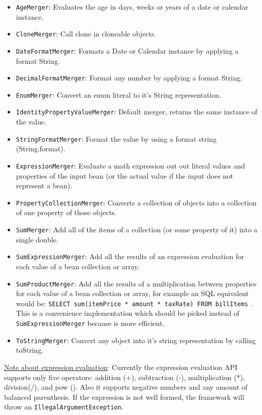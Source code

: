 \documentclass[11pt]{article}
\begin{document}
\begin{itemize}
 \item \texttt{AgeMerger}: Evaluates the age in days, weeks or years of a date or calendar instance.
 \item \texttt{CloneMerger}: Call clone in cloneable objects.
 \item \texttt{DateFormatMerger}: Formats a Date or Calendar instance by applying a format String.
 \item \texttt{DecimalFormatMerger}: Format any number by applying a format String.
 \item \texttt{EnumMerger}: Convert an enum literal to it's String representation.
 \item \texttt{IdentityPropertyValueMerger}: Default merger, returns the same instance of the value.
 \item \texttt{StringFormatMerger}: Format the value by using a format string (String.format).
 \item \texttt{ExpressionMerger}: Evaluate a math expression out out literal values and properties of the input bean (or the actual value if the input does not represent a bean).
 \item \texttt{PropertyCollectionMerger}: Converts a collection of objects into a collection of one property of those objects.
 \item \texttt{SumMerger}: Add all of the items of a collection (or some property of it) into a single double.
 \item \texttt{SumExpressionMerger}: Add all the results of an expression evaluation for each value of a bean collection or array.
 \item \texttt{SumProductMerger}: Add all the results of a multiplication between properties for each value of a bean collection or array, for example an SQL equivalent would be: \texttt{SELECT sum(itemPrice * amount * taxRate) FROM billItems }. This is a convenience implementation which should be picked instead of \texttt{SumExpressionMerger} because is more efficient.
 \item \texttt{ToStringMerger}: Convert any object into it's string representation by calling toString.
\end{itemize}

\underline{Note about expression evaluation}: Currently the expression evaluation API supports only five operators: addition (+), subtraction (-), multiplication (*), division(/), and pow (). Also it supports negative numbers and any amount of balanced parenthesis. If the expression is not well formed, the framework will throw an \texttt{IllegalArgumentException}.
\end{document}
